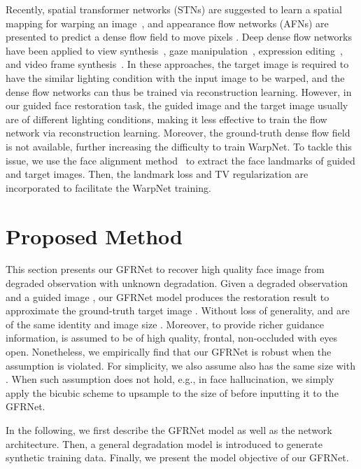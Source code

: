 \documentclass[runningheads]{llncs}
\begin{document}
Recently, spatial transformer networks (STNs) are suggested to learn a spatial mapping for warping an image~\cite{jaderberg2015spatial}, and appearance flow networks (AFNs) are presented to predict a dense flow field to move pixels \cite{zhou2016view,ganin2016deepwarp}.
Deep dense flow networks have been applied to view synthesis~\cite{zhou2016view,park2017cvpr}, gaze manipulation~\cite{ganin2016deepwarp}, expression editing~\cite{yeh2016semantic}, and video frame synthesis~\cite{liu2017iccv}.
In these approaches, the target image is required to have the similar lighting condition with the input image to be warped, and the dense flow networks can thus be trained via reconstruction learning.
However, in our guided face restoration task, the guided image and the target image usually are of different lighting conditions, making it less effective to train the flow network via reconstruction learning.
Moreover, the ground-truth dense flow field is not available, further increasing the difficulty to train WarpNet.
To tackle this issue, we use the face alignment method~\cite{TCDCN} to extract the face landmarks of guided and target images.
Then, the landmark loss and TV regularization are incorporated to facilitate the WarpNet training.
\section{Proposed Method}\label{section3}
This section presents our GFRNet to recover high quality face image from degraded observation with unknown degradation. Given a degraded observation  and a guided image , our GFRNet model produces the restoration result  to approximate the ground-truth target image .
Without loss of generality,  and  are of the same identity and image size .
Moreover, to provide richer guidance information,  is assumed to be of high quality, frontal, non-occluded with eyes open.
Nonetheless, we empirically find that our GFRNet is robust when the assumption is violated.
For simplicity, we also assume  also has the same size with .
When such assumption does not hold, e.g., in face hallucination, we simply apply the bicubic scheme to upsample  to the size of  before inputting it to the GFRNet.


In the following, we first describe the GFRNet model as well as the network architecture.
Then, a general degradation model is introduced to generate synthetic training data. Finally, we present the model objective of our GFRNet.
\end{document}

